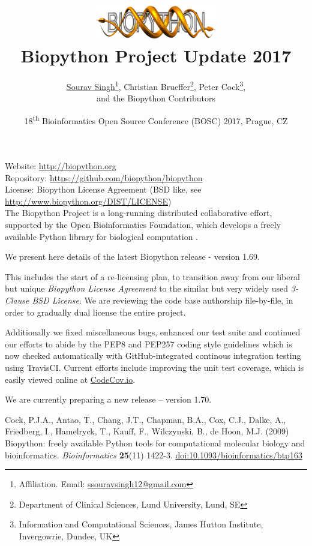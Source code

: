 \documentclass[10pt,oneside]{article}
\title{%
\vspace{-1.5in}
\includegraphics[width=0.4\textwidth]{biopython.jpg}\\
\vspace{3mm}Biopython Project Update 2017}
\author{
	\underline{Sourav Singh}\thanks{Affiliation. Email: \href{mailto:ssouravsingh12@gmail.com}{ssouravsingh12@gmail.com}},
    Christian Brueffer\thanks{Department of Clinical Sciences, Lund University, Lund, SE},
    Peter Cock\thanks{Information and Computational Sciences, James Hutton Institute, Invergowrie, Dundee, UK},\\
    and the Biopython Contributors}
\date{18\textsuperscript{th} Bioinformatics Open Source Conference (BOSC) 2017, Prague, CZ}
\begin{document}
\maketitle
\thispagestyle{empty}

\vspace{-0.2in}
\noindent
Website: \url{http://biopython.org} \\
Repository: \url{https://github.com/biopython/biopython} \\
License: Biopython License Agreement (BSD like, see \url{http://www.biopython.org/DIST/LICENSE}) \\

The Biopython Project is a long-running distributed collaborative effort,
supported by the Open Bioinformatics Foundation, which develops a freely
available Python library for biological computation \cite{AppNote}.

We present here details of the latest Biopython release - version 1.69.

This includes the start of a re-licensing plan, to transition away from our liberal
but unique \emph{Biopython License Agreement} to the similar but very widely used
\emph{3-Clause BSD License}. We are reviewing the code base authorship file-by-file,
in order to gradually dual license the entire project.

Additionally we fixed miscellaneous bugs, enhanced our test suite and continued our
efforts to abide by the PEP8 and PEP257 coding style guidelines which is now checked
automatically with GitHub-integrated continous integration testing using TravisCI.
Current efforts include improving the unit test coverage, which is easily viewed
online at \href{https://codecov.io/github/biopython/biopython/}{CodeCov.io}.

We are currently preparing a new release -- version 1.70.

\begin{thebibliography}{}

Cock, P.J.A., Antao, T., Chang, J.T., Chapman, B.A., Cox, C.J., Dalke, A., Friedberg, I., Hamelryck, T., Kauff, F., Wilczynski, B., de Hoon, M.J. (2009) Biopython: freely available Python tools for computational molecular biology and bioinformatics. {\it Bioinformatics} {\bf 25}(11) 1422-3. \href{http://dx.doi.org/10.1093/bioinformatics/btp163}{doi:10.1093/bioinformatics/btp163}

\end{thebibliography}
\end{document}
